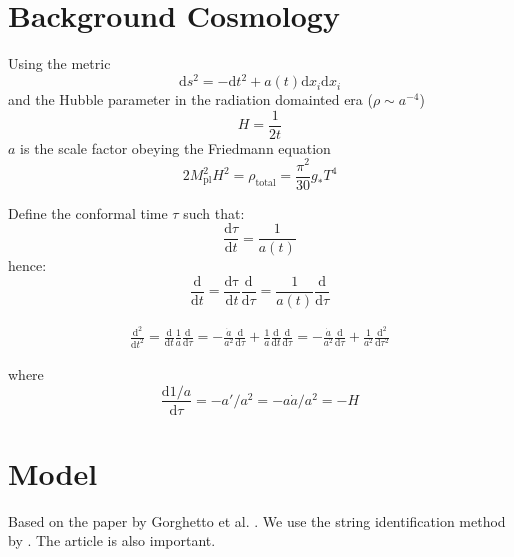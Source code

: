 \documentclass[a4paper]{article}
\begin{document}
\section{Background Cosmology}
Using the metric
\begin{equation}
    \mathrm{d}s^2 = -\mathrm{d}t^2 + a(t) \mathrm{d} x_i \mathrm{d} x_i
\end{equation}
and the Hubble parameter in the radiation domainted era ($\rho \sim a^{-4}$)
\begin{equation}
    H = \frac{1}{2t}
\end{equation}
$a$ is the scale factor obeying the Friedmann equation
\begin{equation}
    2 M_\mathrm{pl}^2 H^2 = \rho_\mathrm{total} = \frac{\pi^2}{30} g_* T^4
\end{equation}

Define the conformal time $\tau$ such that:
\begin{equation}
    \frac{\mathrm{d} \tau}{\mathrm{d} t} = \frac{1}{a(t)}
\end{equation}
hence:
\begin{equation}
    \frac{\mathrm{d}}{\mathrm{d} t} = \frac{\mathrm{d \tau}}{\mathrm{d} t} \frac{\mathrm{d}}{\mathrm{d} \tau} = \frac{1}{a(t)} \frac{\mathrm{d}}{\mathrm{d} \tau}
\end{equation}

\begin{align}
    \frac{\mathrm{d}^2}{\mathrm{d} t^2} = \frac{\mathrm{d}}{\mathrm{d} t} \frac{1}{a} \frac{\mathrm{d}}{\mathrm{d} \tau}
    = - \frac{\dot{a}}{a^2} \frac{\mathrm{d}}{\mathrm{d} \tau} + \frac{1}{a} \frac{\mathrm{d}}{\mathrm{d} t} \frac{\mathrm{d}}{\mathrm{d} \tau}
     = - \frac{\dot{a}}{a^2} \frac{\mathrm{d}}{\mathrm{d} \tau} + \frac{1}{a^2} \frac{\mathrm{d}^2}{\mathrm{d} \tau^2}
\end{align}

where
\begin{equation}
    \frac{\mathrm{d} 1/a}{\mathrm{d} \tau} = - a' / a^2 = - a \dot{a} / a^2 = - H
\end{equation}

\section{Model}

Based on the paper by Gorghetto et al. \cite{axions_from_strings}.
We use the string identification method by \cite{axion_dark_matter_strings_and_their_cores}.
The article \cite{improved_estimation_hiramatsu} is also important.
\end{document}
